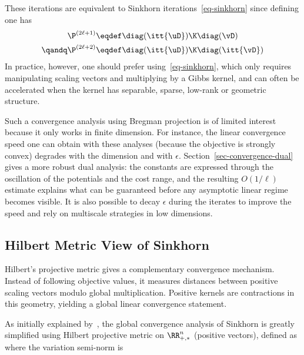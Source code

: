 These iterations are equivalent to Sinkhorn iterations~\eqref{eq-sinkhorn} since defining
\eq{\label{eq-sink-matrix}\P^{(2\ell)} \eqdef \diag(\it{\uD}) \K \diag(\it{\vD}),}
one has
\begin{align*}
	\P^{(2\ell+1)} &\eqdef \diag(\itt{\uD}) \K \diag(\it{\vD}) \\
	\qandq
	\P^{(2\ell+2)} &\eqdef \diag(\itt{\uD}) \K \diag(\itt{\vD})
\end{align*}
In practice, however, one should prefer using~\eqref{eq-sinkhorn}, which only requires manipulating scaling vectors and multiplying by a Gibbs kernel, and can often be accelerated when the kernel has separable, sparse, low-rank or geometric structure.

Such a convergence analysis using Bregman projection is of limited interest because it only works in finite dimension. For instance, the linear convergence speed one can obtain with these analyses (because the objective is strongly convex) degrades with the dimension and with $\epsilon$. Section~\ref{sec-convergence-dual} gives a more robust dual analysis: the constants are expressed through the oscillation of the potentials and the cost range, and the resulting $O(1/\ell)$ estimate explains what can be guaranteed before any asymptotic linear regime becomes visible.
%
It is also possible to decay $\epsilon$ during the iterates to improve the speed and rely on multiscale strategies in low dimensions.


\subsection{Hilbert Metric View of Sinkhorn}
\label{sec-sinkhorn-hilbert}

Hilbert's projective metric gives a complementary convergence mechanism. Instead of following objective values, it measures distances between positive scaling vectors modulo global multiplication. Positive kernels are contractions in this geometry, yielding a global linear convergence statement.

As initially explained by~\cite{franklin1989scaling}, the global convergence analysis of Sinkhorn is greatly simplified using Hilbert projective metric on $\RR_{+,*}^n$ (positive vectors), defined as
where the variation semi-norm is

